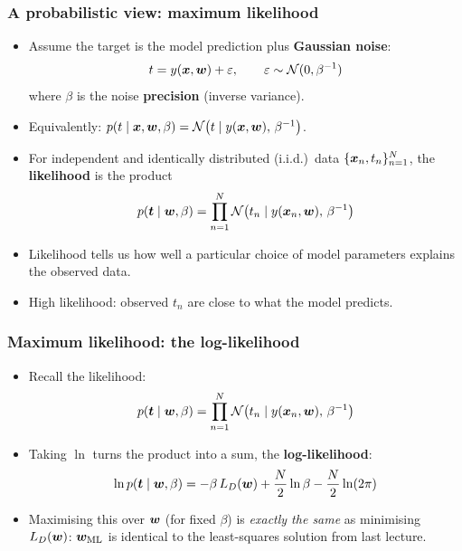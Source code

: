 \documentclass[10pt]{beamer}
\begin{document}
\begin{frame}[fragile]
\frametitle{A probabilistic view: maximum likelihood}

\begin{itemize}
\item Assume the target is the model prediction plus \textbf{Gaussian
  noise}:
\[
t = y(\boldsymbol{x},\boldsymbol{w}) + \varepsilon, \qquad \varepsilon \sim \mathcal{N}(0,\beta^{-1})
\]
where $\beta$ is the noise \textbf{precision} (inverse variance).
\item Equivalently: $p(t\mid \boldsymbol{x},\boldsymbol{w},\beta) = \mathcal{N}\bigl(t \mid
y(\boldsymbol{x},\boldsymbol{w}),\, \beta^{-1}\bigr)$.
\end{itemize}

\begin{itemize}
\item For independent and identically distributed (i.i.d.)\ data
  $\{\boldsymbol{x}_n, t_n\}_{n=1}^N$, the \textbf{likelihood} is the product
\[
p(\boldsymbol{t}\mid \boldsymbol{w},\beta) = \prod_{n=1}^{N} \mathcal{N}\bigl(t_n \mid
y(\boldsymbol{x}_n,\boldsymbol{w}),\, \beta^{-1}\bigr)
\]
\item[$\Rightarrow$] Likelihood tells us how well a particular choice of
  model parameters explains the observed data.
\item[$\Rightarrow$] High likelihood: observed $t_n$ are close to what
  the model predicts.
\end{itemize}

\end{frame}
\begin{frame}[fragile]
\frametitle{Maximum likelihood: the log-likelihood}

\begin{itemize}
\item Recall the likelihood:
\[
p(\boldsymbol{t}\mid \boldsymbol{w},\beta) = \prod_{n=1}^{N} \mathcal{N}\bigl(t_n \mid
y(\boldsymbol{x}_n,\boldsymbol{w}),\, \beta^{-1}\bigr)
\]
\item Taking $\ln$ turns the product into a sum, the
  \textbf{log-likelihood}:
\[
\ln p(\boldsymbol{t}\mid \boldsymbol{w},\beta) = -\beta\, L_D(\boldsymbol{w}) + \frac{N}{2}\ln\beta -
\frac{N}{2}\ln(2\pi)
\]
\item[$\Rightarrow$] Maximising this over $\boldsymbol{w}$ (for fixed $\beta$) is
  \emph{exactly the same} as minimising $L_D(\boldsymbol{w})$: $\boldsymbol{w}_{\mathrm{ML}}$
  is identical to the least-squares solution from last lecture.
\end{itemize}

\end{frame}
\end{document}
